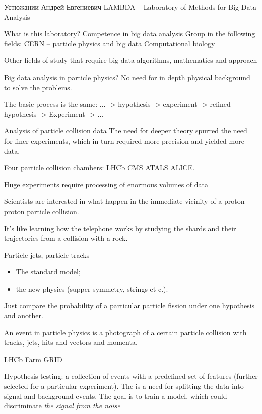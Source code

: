 Устюжании Андрей Евгениевич
LAMBDA -- Laboratory of Methods for Big Data Analysis

What is this laboratory?
Competence in big data analysis
Group in the following fields:
	CERN -- particle physics and big data
	Computational biology

Other fields of study that require big data algorithms, mathematics and approach

Big data analysis in particle physics? No need for in depth physical background to solve the problems.

The basic process is the same:
... -> hypothesis -> experiment -> refined hypothesis -> Experiment -> ...

Analysis of particle collision data
The need for deeper theory spurred the need for finer experiments, which in turn required more precision and yielded more data.

Four particle collision chambers: LHCb CMS ATALS ALICE.

Huge experiments require processing of enormous volumes of data

Scientists are interested in what happen in the immediate vicinity of a proton-proton particle collision.

It's like learning how the telephone works by studying the shards and their trajectories from a collision with a rock.

Particle jets, particle tracks

\begin{itemize}
	\item The standard model;
	\item the new physics (supper symmetry, strings et c.).
\end{itemize}

Just compare the probability of a particular particle fission under one hypothesis and another.

An event in particle physics is a photograph of a certain particle collision with tracks, jets, hits and vectors and momenta.

LHCb  Farm  GRID

Hypothesis testing: a collection of events with a predefined set of features (further selected for a particular experiment).
The is a need for splitting the data into signal and background events.
The goal is to train a model, which could discriminate \emph{the signal from the noise}

